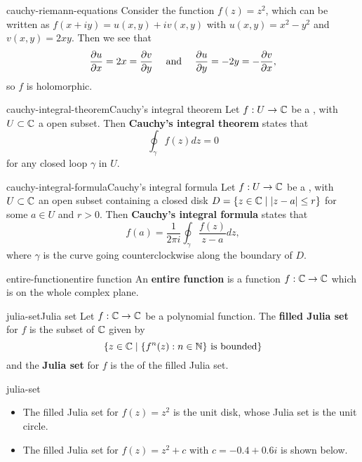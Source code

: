 \begin{example}{cauchy-riemann-equations}
    Consider the function $f(z) = z^2$, which can be written as $f(x + iy) = u(x, y) + iv(x, y)$ with $u(x, y) = x^2 - y^2$ and $v(x, y) = 2xy$. Then we see that
    \[ \frac{\partial u}{\partial x} = 2x = \frac{\partial v}{\partial y} \quad \textup{ and } \quad \frac{\partial u}{\partial y} = -2y = -\frac{\partial v}{\partial x} , \]
    so $f$ is holomorphic.
\end{example}

\begin{topic}{cauchy-integral-theorem}{Cauchy's integral theorem}
    Let $f : U \to \mathbb{C}$ be a , with $U \subset \mathbb{C}$ a  open subset. Then \textbf{Cauchy's integral theorem} states that
    \[ \oint_\gamma f(z) dz = 0 \]
    for any closed loop $\gamma$ in $U$.
\end{topic}

\begin{topic}{cauchy-integral-formula}{Cauchy's integral formula}
    Let $f : U \to \mathbb{C}$ be a , with $U \subset \mathbb{C}$ an open subset containing a closed disk $D = \{ z \in \mathbb{C} \mid |z - a| \le r \}$ for some $a \in U$ and $r > 0$. Then \textbf{Cauchy's integral formula} states that
    \[ f(a) = \frac{1}{2 \pi i} \oint_\gamma \frac{f(z)}{z - a} dz , \]
    where $\gamma$ is the curve going counterclockwise along the boundary of $D$.
\end{topic}

\begin{topic}{entire-function}{entire function}
    An \textbf{entire function} is a function $f : \mathbb{C} \to \mathbb{C}$ which is  on the whole complex plane.
\end{topic}

\begin{topic}{julia-set}{Julia set}
    Let $f : \mathbb{C} \to \mathbb{C}$ be a polynomial function. The \textbf{filled Julia set} for $f$ is the subset of $\mathbb{C}$ given by
    \[  \{ z \in \mathbb{C} \mid \{ f^n(z) : n \in \mathbb{N} \} \textup{ is bounded} \} \]
    and the \textbf{Julia set} for $f$ is the  of the filled Julia set.
\end{topic}

\begin{example}{julia-set}
    \begin{itemize}
        \item The filled Julia set for $f(z) = z^2$ is the unit disk, whose Julia set is the unit circle.
    
        \item The filled Julia set for $f(z) = z^2 + c$ with $c = -0.4 + 0.6i$ is shown below.
    \end{itemize}
\end{example}

